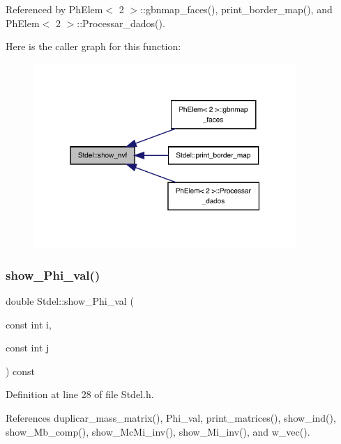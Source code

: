 Referenced by Ph\+Elem$<$ 2 $>$\+::gbnmap\+\_\+faces(), print\+\_\+border\+\_\+map(), and Ph\+Elem$<$ 2 $>$\+::\+Processar\+\_\+dados().

Here is the caller graph for this function\+:
\nopagebreak
\begin{figure}[H]
\begin{center}
\leavevmode
\includegraphics[width=283pt]{classStdel_a2a504322269a749dd3c443d0e86c4a6c_icgraph}
\end{center}
\end{figure}
\mbox{\label{classStdel_a6565c36150823a1f52a2daf05806f7a4}} 
\subsubsection{\texorpdfstring{show\+\_\+\+Phi\+\_\+val()}{show\_Phi\_val()}}
{\footnotesize\ttfamily double Stdel\+::show\+\_\+\+Phi\+\_\+val (\begin{DoxyParamCaption}\item[{const int}]{i,  }\item[{const int}]{j }\end{DoxyParamCaption}) const\hspace{0.3cm}{\ttfamily [inline]}}



Definition at line 28 of file Stdel.\+h.



References duplicar\+\_\+mass\+\_\+matrix(), Phi\+\_\+val, print\+\_\+matrices(), show\+\_\+ind(), show\+\_\+\+Mb\+\_\+comp(), show\+\_\+\+Mc\+Mi\+\_\+inv(), show\+\_\+\+Mi\+\_\+inv(), and w\+\_\+vec().




